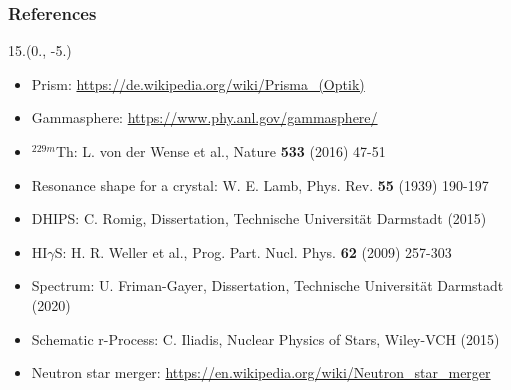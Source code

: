 \documentclass{beamer}
\begin{document}
\begin{frame}
    \frametitle{References}
    \begin{textblock}{15.}(0., -5.)
    \begin{itemize}
        \item Prism: \url{https://de.wikipedia.org/wiki/Prisma_(Optik)}
        \item Gammasphere: \url{https://www.phy.anl.gov/gammasphere/}
        \item $^{229m}$Th: L. von der Wense et al., Nature \textbf{533} (2016) 47-51
        \item Resonance shape for a crystal: W. E. Lamb, Phys. Rev. \textbf{55} (1939) 190-197
        \item DHIPS: C. Romig, Dissertation, Technische Universit\"at Darmstadt (2015)
        \item HI$\gamma$S: H. R. Weller et al., Prog. Part. Nucl. Phys. \textbf{62} (2009) 257-303
        \item Spectrum: U. Friman-Gayer, Dissertation, Technische Universit\"at Darmstadt (2020)
        \item Schematic r-Process: C. Iliadis, Nuclear Physics of Stars, Wiley-VCH (2015)
        \item Neutron star merger: \url{https://en.wikipedia.org/wiki/Neutron_star_merger}
    \end{itemize}
    \end{textblock}
\end{frame}
\end{document}
